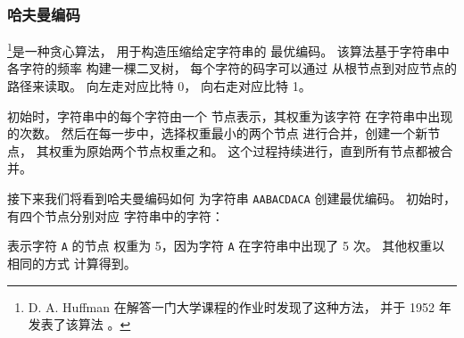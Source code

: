 
\subsubsection{哈夫曼编码}

\footnote{D. A. Huffman 在解答一门大学课程的作业时发现了这种方法，
并于 1952 年发表了该算法 \cite{huf52}。}是一种贪心算法，
用于构造压缩给定字符串的
最优编码。
该算法基于字符串中各字符的频率
构建一棵二叉树，
每个字符的码字可以通过
从根节点到对应节点的路径来读取。
向左走对应比特 0，
向右走对应比特 1。

初始时，字符串中的每个字符由一个
节点表示，其权重为该字符
在字符串中出现的次数。
然后在每一步中，选择权重最小的两个节点
进行合并，创建一个新节点，
其权重为原始两个节点权重之和。
这个过程持续进行，直到所有节点都被合并。

接下来我们将看到哈夫曼编码如何
为字符串 \texttt{AABACDACA}
创建最优编码。
初始时，有四个节点分别对应
字符串中的字符：

\begin{center}
\end{center}
表示字符 \texttt{A} 的节点
权重为 5，因为字符 \texttt{A}
在字符串中出现了 5 次。
其他权重以相同的方式
计算得到。

